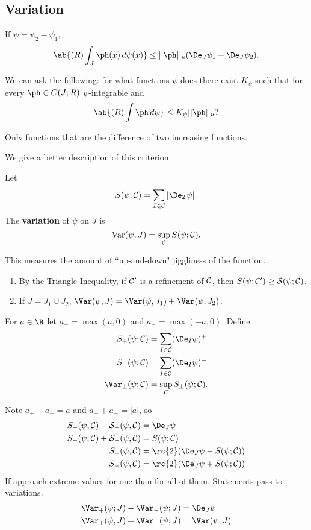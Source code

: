 \subsection{Variation}
\begin{pr}
If $\psi=\psi_2-\psi_1$,
\[
\ab{(R)\int_J \ph(x)\,d\psi(x)}\leq ||\ph||_u(\De_J\psi_1+\De_J\psi_2).
\]
\end{pr}
We can ask the following: for what functions $\psi$ does there exist $K_{\psi}$ such that for every $\ph\in C(J;R)$ $\psi$-integrable and 
\[\ab{(R)\int \ph\,d\psi}\leq K_{\psi}||\ph||_u?\]
\begin{thm}
Only functions that are the difference of two increasing functions.
\end{thm}
We give a better description of this criterion.
\begin{df}
Let
\[
S(\psi,\cal C)=\sum_{I\in\cal C} |\De_I \psi|.
\]
The \textbf{variation} of $\psi$ on $J$ is
\[
\text{Var}(\psi, J)=
\sup_{\cal C}
S(\psi;\cal C).
\]
\end{df}
This measures the amount of ``up-and-down" jiggliness of the function.
\begin{pr}

\begin{enumerate}
\item By the Triangle Inequality, if $\cal C'$ is a refinement of $\cal C$, then 
$S(\psi;\cal C')\geq S(\psi;\cal C)$.
\item If $J=J_1\cup J_2$, $\Var(\psi,J)=\Var(\psi,J_1)+\Var(\psi,J_2)$.
\end{enumerate}
\end{pr}
\begin{df}
For $a\in \R$ let $a_+=\max(a,0)$ and $a_-=\max(-a,0)$. Define
\begin{align*}
S_+(\psi;\cal C)&=\sum_{I\in \cal C} (\De_I \psi)^+\\
S_-(\psi;\cal C)&=\sum_{I\in \cal C} (\De_I \psi)^-\\
\Var_{\pm} (\psi; \cal C)&=\sup_{\cal C} S_{\pm}(\psi; \cal C).
\end{align*}
\end{df}
Note $a_+-a_-=a$ and $a_++a_-=|a|$, so 
\begin{align*}
S_+(\psi,\cal C)-S_-(\psi, \cal C)&=\De_J \psi\\
S_+(\psi,\cal C)+S_-(\psi, \cal C)&=S(\psi;\cal C)\\
S_+(\psi,\cal C)&=\rc{2}(\De_J\psi-S(\psi; \cal C))\\
S_-(\psi,\cal C)&=\rc{2}(\De_J\psi+S(\psi; \cal C))
\end{align*}
If approach extreme values for one than for all of them. Statements pass to variations.
\begin{align*}
\Var_+(\psi;J)-\Var_-(\psi;J)&=\De_J \psi\\
\Var_+(\psi,J)+\Var_-(\psi;J)&=\Var(\psi;J)
\end{align*}
